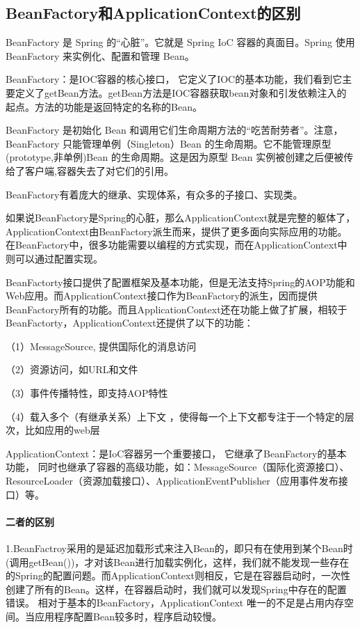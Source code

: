 \documentclass[../../../interview-questions.tex]{subfiles}
\begin{document}
\subsection{BeanFactory和ApplicationContext的区别}

BeanFactory 是 Spring 的“心脏”。它就是 Spring IoC 容器的真面目。Spring 使用 BeanFactory 来实例化、配置和管理 Bean。

BeanFactory：是IOC容器的核心接口， 它定义了IOC的基本功能，我们看到它主要定义了getBean方法。getBean方法是IOC容器获取bean对象和引发依赖注入的起点。方法的功能是返回特定的名称的Bean。

BeanFactory 是初始化 Bean 和调用它们生命周期方法的“吃苦耐劳者”。注意，BeanFactory 只能管理单例（Singleton）Bean 的生命周期。它不能管理原型(prototype,非单例)Bean 的生命周期。这是因为原型 Bean 实例被创建之后便被传给了客户端,容器失去了对它们的引用。

BeanFactory有着庞大的继承、实现体系，有众多的子接口、实现类。


如果说BeanFactory是Spring的心脏，那么ApplicationContext就是完整的躯体了，ApplicationContext由BeanFactory派生而来，提供了更多面向实际应用的功能。在BeanFactory中，很多功能需要以编程的方式实现，而在ApplicationContext中则可以通过配置实现。

BeanFactorty接口提供了配置框架及基本功能，但是无法支持Spring的AOP功能和Web应用。而ApplicationContext接口作为BeanFactory的派生，因而提供BeanFactory所有的功能。而且ApplicationContext还在功能上做了扩展，相较于BeanFactorty，ApplicationContext还提供了以下的功能： 

（1）MessageSource, 提供国际化的消息访问

（2）资源访问，如URL和文件 

（3）事件传播特性，即支持AOP特性

（4）载入多个（有继承关系）上下文 ，使得每一个上下文都专注于一个特定的层次，比如应用的web层 

ApplicationContext：是IoC容器另一个重要接口， 它继承了BeanFactory的基本功能， 同时也继承了容器的高级功能，如：MessageSource（国际化资源接口）、ResourceLoader（资源加载接口）、ApplicationEventPublisher（应用事件发布接口）等。

\paragraph{二者的区别}

1.BeanFactroy采用的是延迟加载形式来注入Bean的，即只有在使用到某个Bean时(调用getBean())，才对该Bean进行加载实例化，这样，我们就不能发现一些存在的Spring的配置问题。而ApplicationContext则相反，它是在容器启动时，一次性创建了所有的Bean。这样，在容器启动时，我们就可以发现Spring中存在的配置错误。 相对于基本的BeanFactory，ApplicationContext 唯一的不足是占用内存空间。当应用程序配置Bean较多时，程序启动较慢。
\end{document}
